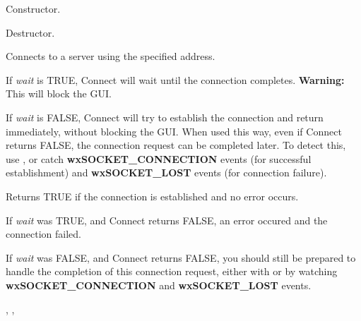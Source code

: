 
Constructor.



%
%


Destructor.

%
%
\label{wxsocketclientconnect}


Connects to a server using the specified address.

If {\it wait} is TRUE, Connect will wait until the connection completes.
{\bf Warning:} This will block the GUI.

If {\it wait} is FALSE, Connect will try to establish the connection and
return immediately, without blocking the GUI. When used this way, even if
Connect returns FALSE, the connection request can be completed later.
To detect this, use ,
or catch {\bf wxSOCKET\_CONNECTION} events (for successful establishment)
and {\bf wxSOCKET\_LOST} events (for connection failure).





Returns TRUE if the connection is established and no error occurs.

If {\it wait} was TRUE, and Connect returns FALSE, an error occured
and the connection failed.

If {\it wait} was FALSE, and Connect returns FALSE, you should still
be prepared to handle the completion of this connection request, either
with  or by watching
{\bf wxSOCKET\_CONNECTION} and {\bf wxSOCKET\_LOST} events.


, 
, 

